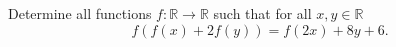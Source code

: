 Determine all functions $f\colon\mathbb{R}\rightarrow\mathbb{R}$ such that
for all $x,y\in\mathbb{R}$
$$f\left( f(x) + 2f(y) \right) = f(2x) + 8y + 6.$$
